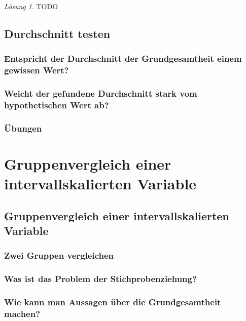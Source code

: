 \documentclass[
]{book}
\theoremstyle{definition}
\theoremstyle{definition}
\theoremstyle{definition}
\theoremstyle{definition}
\theoremstyle{remark}
\newtheorem*{solution}{Lösung}
\begin{document}
\begin{solution}
TODO
\end{solution}

\chapter{Durchschnitt testen}\label{durchschnitt-testen}

\section{Entspricht der Durchschnitt der Grundgesamtheit einem gewissen Wert?}\label{entspricht-der-durchschnitt-der-grundgesamtheit-einem-gewissen-wert}

\section{Weicht der gefundene Durchschnitt stark vom hypothetischen Wert ab?}\label{weicht-der-gefundene-durchschnitt-stark-vom-hypothetischen-wert-ab}

\section{Übungen}\label{uxfcbungen-2}

\part{Gruppenvergleich einer intervallskalierten Variable}\label{part-gruppenvergleich-einer-intervallskalierten-variable}

\chapter{Gruppenvergleich einer intervallskalierten Variable}\label{gruppenvergleich-einer-intervallskalierten-variable}

\section{Zwei Gruppen vergleichen}\label{zwei-gruppen-vergleichen}

\section{Was ist das Problem der Stichprobenziehung?}\label{was-ist-das-problem-der-stichprobenziehung}

\section{Wie kann man Aussagen über die Grundgesamtheit machen?}\label{wie-kann-man-aussagen-uxfcber-die-grundgesamtheit-machen}
\end{document}
